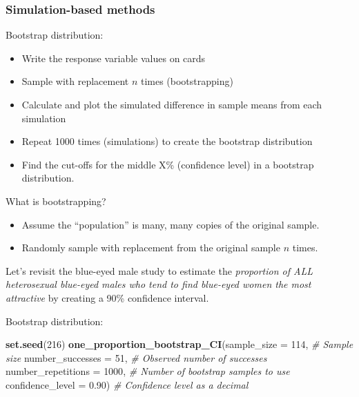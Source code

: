 \documentclass[
]{report}
\newenvironment{Shaded}{\begin{snugshade}}{\end{snugshade}}
\newcommand{\AttributeTok}[1]{\textcolor[rgb]{0.13,0.29,0.53}{#1}}
\newcommand{\CommentTok}[1]{\textcolor[rgb]{0.56,0.35,0.01}{\textit{#1}}}
\newcommand{\DecValTok}[1]{\textcolor[rgb]{0.00,0.00,0.81}{#1}}
\newcommand{\FloatTok}[1]{\textcolor[rgb]{0.00,0.00,0.81}{#1}}
\newcommand{\FunctionTok}[1]{\textcolor[rgb]{0.13,0.29,0.53}{\textbf{#1}}}
\newcommand{\NormalTok}[1]{#1}
\begin{document}

\hypertarget{simulation-based-methods}{%
\subsubsection*{Simulation-based methods}\label{simulation-based-methods}}

Bootstrap distribution:

\begin{itemize}
\item
  Write the response variable values on cards
\item
  Sample with replacement \(n\) times (bootstrapping)
\item
  Calculate and plot the simulated difference in sample means from each simulation
\item
  Repeat 1000 times (simulations) to create the bootstrap distribution
\item
  Find the cut-offs for the middle X\% (confidence level) in a bootstrap distribution.
\end{itemize}

What is bootstrapping?

\begin{itemize}
\item
  Assume the ``population'' is many, many copies of the original sample.
\item
  Randomly sample with replacement from the original sample \(n\) times.
\end{itemize}

Let's revisit the blue-eyed male study to estimate the \emph{proportion of ALL heterosexual blue-eyed males who tend to find blue-eyed women the most attractive} by creating a 90\% confidence interval.

Bootstrap distribution:

\begin{Shaded}
\begin{Highlighting}[]
\FunctionTok{set.seed}\NormalTok{(}\DecValTok{216}\NormalTok{)}
\FunctionTok{one\_proportion\_bootstrap\_CI}\NormalTok{(}\AttributeTok{sample\_size =} \DecValTok{114}\NormalTok{, }\CommentTok{\# Sample size}
                    \AttributeTok{number\_successes =} \DecValTok{51}\NormalTok{, }\CommentTok{\# Observed number of successes}
                    \AttributeTok{number\_repetitions =} \DecValTok{1000}\NormalTok{, }\CommentTok{\# Number of bootstrap samples to use}
                    \AttributeTok{confidence\_level =} \FloatTok{0.90}\NormalTok{) }\CommentTok{\# Confidence level as a decimal}
\end{Highlighting}
\end{Shaded}
\end{document}
